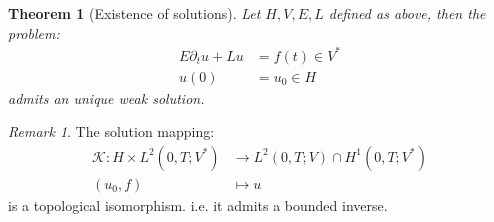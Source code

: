 \documentclass[a4paper,11pt,oneside,fleqn]{book}
\newtheorem{theorem}{Theorem}[section]
\theoremstyle{definition}
\theoremstyle{remark}
\newtheorem*{remark}{Remark}
\begin{document}
 


 
 \begin{theorem}[Existence of solutions]
 		Let $H, V, E, L$ defined as above, then the problem:
 		\begin{align*}
 			E \partial_t u + Lu &= f(t) \in V^* \\
 			u(0) &= u_0 \in H
 		\end{align*}
 		admits an unique weak solution. 
 \end{theorem}
 \begin{remark}
 The solution mapping:
 \begin{align*}
 	\mathcal{K}: H \times L^2(0, T; V^*) &\rightarrow L^2(0,T; V) \cap H^1(0, T; V^*)\\
 	(u_0, f ) &\mapsto u
 \end{align*}	
 is a topological isomorphism. i.e. it admits a bounded inverse. 
 \end{remark}
\end{document}
